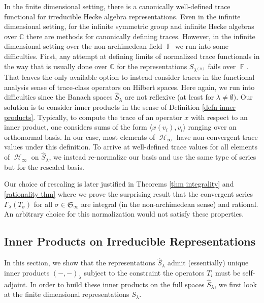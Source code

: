 \documentclass[12pt,reqno]{amsart}
\theoremstyle{definition}
\DeclareMathOperator{\bF}{\mathbb{F}}
\DeclareMathOperator{\cH}{\mathcal{H}}
\begin{document}
In the finite dimensional setting, there is a canonically well-defined trace functional for irreducible Hecke algebra representations. Even in the infinite dimensional setting, for the infinite symmetric group and infinite Hecke algebras over $\mathbb{C}$ there are methods for canonically defining traces. However, in the infinite dimensional setting over the non-archimedean field $\bF$ we run into some difficulties. First, any attempt at defining limits of normalized trace functionals in the way that is usually done over $\mathbb{C}$ for the representations $S_{\lambda^{(n)}}$ fails over $\bF$. That leaves the only available option to instead consider traces in the functional analysis sense of trace-class operators on Hilbert spaces. Here again, we run into difficulties since the Banach spaces $\hat{S}_{\lambda}$ are not reflexive (at least for $\lambda \neq \emptyset).$ Our solution is to consider inner products in the sense of Definition \ref{defn inner products}. Typically, to compute the trace of an operator $x$ with respect to an inner product, one considers sums of the form $\langle x(v_i),v_i \rangle$ ranging over an orthonormal basis. In our case, most elements of $\cH_{\infty}$ have non-convergent trace values under this definition. To arrive at well-defined trace values for all elements of $\cH_{\infty}$ on $\hat{S}_{\lambda}$, we instead re-normalize our basis and use the same type of series but for the rescaled basis. 

Our choice of rescaling is later justified in Theorems \ref{thm integrality} and \ref{rationality thm} where we prove the surprising result that the convergent series $\Gamma_{\lambda}(T_{\sigma})$ for all $\sigma \in \mathfrak{S}_{\infty}$ are integral (in the non-archimedean sense) and rational. An arbitrary choice for this normalization would not satisfy these properties.

\subsection{Inner Products on Irreducible Representations}

In this section, we show that the representations $\hat{S}_{\lambda}$ admit (essentially) unique inner products $(-,-)_{\lambda}$ subject to the constraint the operators $T_i$ must be self-adjoint. In order to build these inner products on the full spaces $\hat{S}_{\lambda}$, we first look at the finite dimensional representations $S_{\lambda}.$
\end{document}
